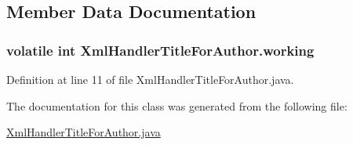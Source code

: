 \subsection{Member Data Documentation}
\hypertarget{classXmlHandlerTitleForAuthor_aacfb0b6097f6d67493b600563cc91ec7}{
\subsubsection[{working}]{\setlength{\rightskip}{0pt plus 5cm}volatile int Xml\-Handler\-Title\-For\-Author.\-working}}\label{classXmlHandlerTitleForAuthor_aacfb0b6097f6d67493b600563cc91ec7}


Definition at line 11 of file Xml\-Handler\-Title\-For\-Author.\-java.



The documentation for this class was generated from the following file\-:\begin{DoxyCompactItemize}
\item 
\hyperlink{XmlHandlerTitleForAuthor_8java}{Xml\-Handler\-Title\-For\-Author.\-java}\end{DoxyCompactItemize}
